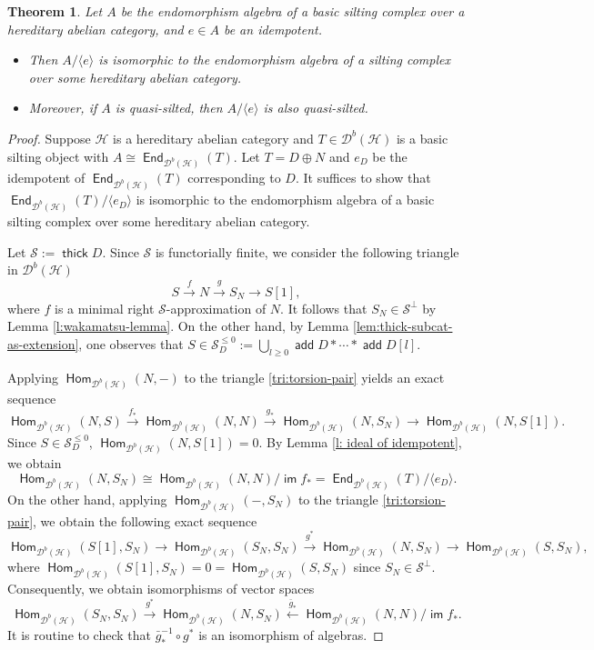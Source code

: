 \documentclass[12pt,a4paper,reqno]{amsart}
\newtheorem{theorem}{Theorem}[section]
\theoremstyle{definition}
\newcommand{\opname}[1]{\operatorname{\mathsf{#1}}}
\newcommand{\add}{\opname{add}\nolimits}
\newcommand{\der}{\cd}
\newcommand{\thick}{\opname{thick}}
\newcommand{\im}{\opname{im}\nolimits}
\newcommand{\Hom}{\opname{Hom}}
\newcommand{\End}{\opname{End}}
\newcommand{\cd}{{\mathcal D}}
\begin{document}
\begin{theorem}\label{p: idempotent-factor-closed} 
Let $A$ be the endomorphism algebra of a basic silting complex over a hereditary abelian category, and $e\in A$ be an idempotent.
\begin{itemize}
    \item[(a)] Then $A / \langle e \rangle$ is isomorphic to the endomorphism algebra of a silting complex over some hereditary abelian category.
    \item[(b)] Moreover, if $A$ is quasi-silted, then $A / \langle e \rangle$ is also quasi-silted.
\end{itemize}
\end{theorem}
\begin{proof}
Suppose $\mathcal{H}$ is a hereditary abelian category and $T\in \der^b(\mathcal{H})$ is a basic silting object with $A\cong \End_{\der^b(\mathcal{H})}(T)$. Let  $T=D\oplus N$ and $e_D$ be the idempotent of $\End_{\der^b(\mathcal{H})}(T)$ corresponding to $D$. It suffices to show that $\End_{\der^b(\mathcal{H})} (T) / \langle e_D \rangle$ is isomorphic to the endomorphism algebra of a basic silting complex over some hereditary abelian category.

Let $\mathcal{S}:=\thick D$. Since $\mathcal{S}$ is functorially finite, we consider the following triangle in $\der^b(\mathcal{H})$
\begin{equation}\label{tri:torsion-pair}
    S\xrightarrow{f} N\xrightarrow{g} S_N\to S[1],
\end{equation}
where $f$ is a minimal right $\mathcal{S}$-approximation of $N$. It follows that $S_N\in \mathcal{S}^\perp$ by Lemma \ref{l:wakamatsu-lemma}.  On the other hand, by Lemma \ref{lem:thick-subcat-as-extension}, one observes that $S\in \mathcal{S}_D^{\leq 0}:=\bigcup_{l\geq 0}\add D\ast\cdots\ast\add D[l]$.




Applying $\Hom_{\der^b(\mathcal{H})}(N,-)$ to the triangle \eqref{tri:torsion-pair} yields an exact sequence
\[
\Hom_{\der^b(\mathcal{H})}(N,S)\xrightarrow{f_*}\Hom_{\der^b(\mathcal{H})}(N,N)\xrightarrow{g_*}\Hom_{\der^b(\mathcal{H})}(N,S_N)\to \Hom_{\der^b(\mathcal{H})}(N,S[1]).
\]
Since $S\in \mathcal{S}_D^{\leq 0}$, $\Hom_{\der^b(\mathcal{H})}(N,S[1])=0$. By Lemma \ref{l: ideal of idempotent}, we obtain \[\Hom_{\der^b(\mathcal{H})}(N,S_N)\cong \Hom_{\der^b(\mathcal{H})}(N,N)/\im f_*=\End_{\der^b(\mathcal{H})}(T)/\langle e_D\rangle.\]
On the other hand, applying $\Hom_{\der^b(\mathcal{H})}(-,S_N)$ to the triangle \eqref{tri:torsion-pair}, we obtain the following exact sequence
\[
\Hom_{\der^b(\mathcal{H})}(S[1],S_N)\to \Hom_{\der^b(\mathcal{H})}(S_N,S_N)\xrightarrow{g^\ast}\Hom_{\der^b(\mathcal{H})}(N,S_N)\to \Hom_{\der^b(\mathcal{H})}(S,S_N),
\]
where $\Hom_{\der^b(\mathcal{H})}(S[1],S_N)=0=\Hom_{\der^b(\mathcal{H})}(S,S_N)$ since $S_N\in \mathcal{S}^{\perp}$.
Consequently, we obtain isomorphisms of vector spaces 
\[
\Hom_{\der^b(\mathcal{H})}(S_N,S_N)\xrightarrow{g^\ast}\Hom_{\der^b(\mathcal{H})}(N,S_N)\xleftarrow{\bar{g}_*}\Hom_{\der^b(\mathcal{H})}(N,N)/\im f_*.
\]
It is routine to check that $\bar{g}_*^{-1}\circ g^\ast$ is an isomorphism of algebras. 


\end{proof}
\end{document}
